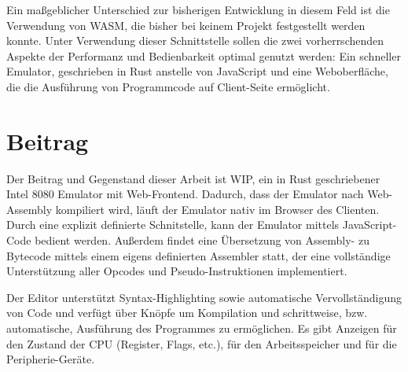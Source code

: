 Ein maßgeblicher Unterschied zur bisherigen Entwicklung in diesem Feld ist die Verwendung von \ac{WASM}, die bisher bei keinem Projekt festgestellt werden konnte. Unter Verwendung dieser Schnittstelle sollen die zwei vorherrschenden Aspekte der Performanz und Bedienbarkeit optimal genutzt werden: Ein schneller Emulator, geschrieben in Rust anstelle von JavaScript und eine Weboberfläche, die die Ausführung von Programmcode auf Client-Seite ermöglicht.

\section{Beitrag}

Der Beitrag und Gegenstand dieser Arbeit ist \ac{WIP}, ein in Rust geschriebener Intel 8080 Emulator mit Web-Frontend. Dadurch, dass der Emulator nach Web-Assembly kompiliert wird, läuft der Emulator nativ im Browser des Clienten. Durch eine explizit definierte Schnitstelle, kann der Emulator mittels JavaScript-Code bedient werden. Außerdem findet eine Übersetzung von Assembly- zu Bytecode mittels einem eigens definierten Assembler statt, der eine vollständige Unterstützung aller Opcodes und Pseudo-Instruktionen implementiert.

Der Editor unterstützt Syntax-Highlighting sowie automatische Vervollständigung von Code und verfügt über Knöpfe um Kompilation und schrittweise, bzw. automatische, Ausführung des Programmes zu ermöglichen.
Es gibt Anzeigen für den Zustand der CPU (Register, Flags, etc.), für den Arbeitsspeicher und für die Peripherie-Geräte.\\
